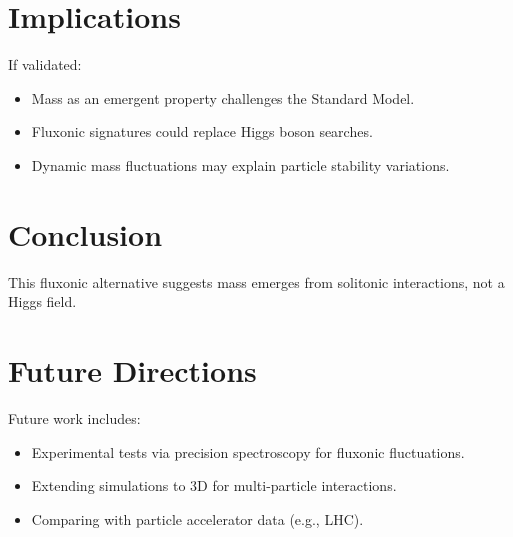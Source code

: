 \documentclass{article}
\begin{document}
\section{Implications}
If validated:
\begin{itemize}
    \item Mass as an emergent property challenges the Standard Model.
    \item Fluxonic signatures could replace Higgs boson searches.
    \item Dynamic mass fluctuations may explain particle stability variations.
\end{itemize}

\section{Conclusion}
This fluxonic alternative suggests mass emerges from solitonic interactions, not a Higgs field.

\section{Future Directions}
Future work includes:
\begin{itemize}
    \item Experimental tests via precision spectroscopy for fluxonic fluctuations.
    \item Extending simulations to 3D for multi-particle interactions.
    \item Comparing with particle accelerator data (e.g., LHC).
\end{itemize}
\end{document}
